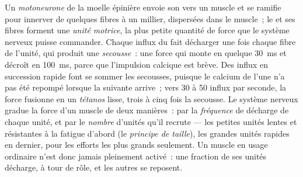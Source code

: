 \begin{definition}\label{def:b2:muscle-movement:motorunit}
Un \emph{motoneurone} de la moelle épinière envoie son  vers un
muscle et se ramifie pour innerver de quelques fibres à un millier,
dispersées dans le muscle~; le  et ses fibres forment une
\emph{unité motrice}, la plus petite quantité de force que le système
nerveux puisse commander. Chaque influx du  fait décharger une
fois chaque fibre de l'unité, qui produit une \emph{secousse}~: une
force qui monte en quelque \qty{30}{ms} et décroît en \qty{100}{ms},
parce que l'impulsion calcique est brève. Des influx en succession
rapide font se sommer les secousses, puisque le calcium de l'une n'a pas
été repompé lorsque la suivante arrive~; vers 30 à 50 influx par seconde,
la force fusionne en un \emph{tétanos} lisse, trois à cinq fois la
secousse. Le système nerveux gradue la force d'un muscle de deux
manières~: par la \emph{fréquence} de décharge de chaque unité, et par le
\emph{nombre} d'unités qu'il recrute --- les petites unités lentes et
résistantes à la fatigue d'abord (le \emph{principe de taille}), les
grandes unités rapides en dernier, pour les efforts les plus grands
seulement. Un muscle en usage ordinaire n'est donc jamais pleinement
activé~: une fraction de ses unités décharge, à tour de rôle, et les
autres se reposent.
\end{definition}

